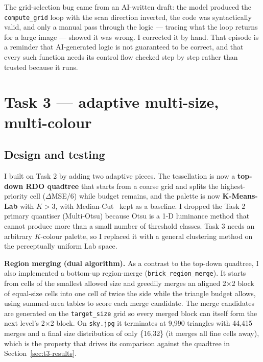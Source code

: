 \documentclass[11pt,a4paper]{article}
\begin{document}
The grid-selection bug came from an AI-written draft: the model produced the
\texttt{compute\_grid} loop with the scan direction inverted, the code was
syntactically valid, and only a manual pass through the logic --- tracing what
the loop returns for a large image --- showed it was wrong. I corrected it by
hand. That episode is a reminder that AI-generated logic is not guaranteed to
be correct, and that every such function needs its control flow checked step by
step rather than trusted because it runs.

\FloatBarrier
\FloatBarrier
\section{Task 3 --- adaptive multi-size, multi-colour}
\label{sec:t3}

\FloatBarrier
\FloatBarrier
\subsection{Design and testing}

I built on Task 2 by adding two adaptive pieces. The tessellation is now a
\textbf{top-down RDO quadtree} that starts from a coarse grid and splits the
highest-priority cell ($\Delta$MSE/6) while budget remains, and the palette is
now \textbf{K-Means-Lab} with $K>3$, with Median-Cut~\cite{heckbert1982} kept as a baseline. I
dropped the Task 2 primary quantiser (Multi-Otsu) because Otsu is a 1-D
luminance method that cannot produce more than a small number of threshold
classes. Task 3 needs an arbitrary $K$-colour palette, so I replaced it with a
general clustering method on the perceptually uniform Lab space.

\textbf{Region merging (dual algorithm).} As a contrast to the top-down
quadtree, I also implemented a bottom-up region-merge
(\texttt{brick\_region\_merge}). It starts from cells of the smallest allowed
size and greedily merges an aligned 2$\times$2 block of equal-size cells into
one cell of twice the side while the triangle budget allows, using summed-area
tables to score each merge candidate. The merge candidates are generated on the
\texttt{target\_size} grid so every merged block can itself form the next
level's 2$\times$2 block. On \texttt{sky.jpg} it terminates at 9{,}990 triangles
with 44{,}415 merges and a final size distribution of only \{16,32\} (it merges
all fine cells away), which is the property that drives its comparison against
the quadtree in Section~\ref{sec:t3-results}.
\end{document}

